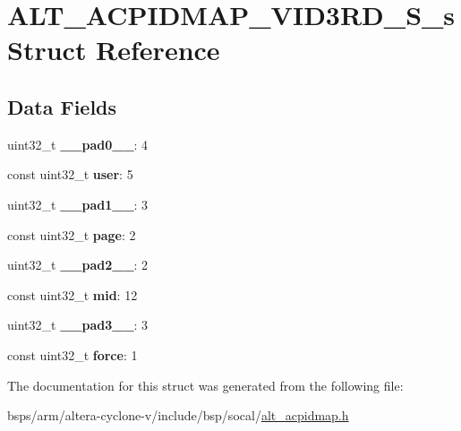 \hypertarget{structALT__ACPIDMAP__VID3RD__S__s}{}\section{A\+L\+T\+\_\+\+A\+C\+P\+I\+D\+M\+A\+P\+\_\+\+V\+I\+D3\+R\+D\+\_\+\+S\+\_\+s Struct Reference}
\label{structALT__ACPIDMAP__VID3RD__S__s}
\subsection*{Data Fields}
\begin{DoxyCompactItemize}
\item 
\mbox{\label{structALT__ACPIDMAP__VID3RD__S__s_a99aa352444871f497e1f297028efab23}} 
uint32\+\_\+t {\bfseries \+\_\+\+\_\+pad0\+\_\+\+\_\+}\+: 4
\item 
\mbox{\label{structALT__ACPIDMAP__VID3RD__S__s_ad7839c7a7dfe098a70e2c7930bab2cdc}} 
const uint32\+\_\+t {\bfseries user}\+: 5
\item 
\mbox{\label{structALT__ACPIDMAP__VID3RD__S__s_af4204d002116fd65779cc388e7011d68}} 
uint32\+\_\+t {\bfseries \+\_\+\+\_\+pad1\+\_\+\+\_\+}\+: 3
\item 
\mbox{\label{structALT__ACPIDMAP__VID3RD__S__s_a7dbaa453cb4adf000a930a476332148b}} 
const uint32\+\_\+t {\bfseries page}\+: 2
\item 
\mbox{\label{structALT__ACPIDMAP__VID3RD__S__s_a66d63232021aafff56144997e85b982c}} 
uint32\+\_\+t {\bfseries \+\_\+\+\_\+pad2\+\_\+\+\_\+}\+: 2
\item 
\mbox{\label{structALT__ACPIDMAP__VID3RD__S__s_acb56b48898f70c333efb1f0fbfa70dee}} 
const uint32\+\_\+t {\bfseries mid}\+: 12
\item 
\mbox{\label{structALT__ACPIDMAP__VID3RD__S__s_a3db488b6923d895590c92e3918a280e5}} 
uint32\+\_\+t {\bfseries \+\_\+\+\_\+pad3\+\_\+\+\_\+}\+: 3
\item 
\mbox{\label{structALT__ACPIDMAP__VID3RD__S__s_a10b6099ec9f625c56bb355e527e0dc45}} 
const uint32\+\_\+t {\bfseries force}\+: 1
\end{DoxyCompactItemize}


The documentation for this struct was generated from the following file\+:\begin{DoxyCompactItemize}
\item 
bsps/arm/altera-\/cyclone-\/v/include/bsp/socal/\mbox{\hyperlink{alt__acpidmap_8h}{alt\+\_\+acpidmap.\+h}}\end{DoxyCompactItemize}
